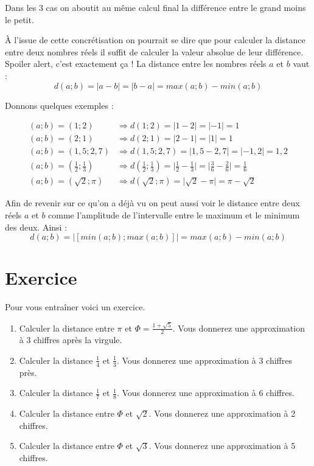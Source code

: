 \documentclass[a4paper, 11pt, twoside]{book}
\begin{document}
Dans les 3 cas on aboutit au même calcul final la différence entre
le grand moins le petit.


À l'issue de cette concrétisation on pourrait se dire que pour
calculer la distance entre deux nombres réels il suffit de calculer
la valeur absolue de leur différence. Spoiler alert, c'est
exactement ça ! La distance entre les nombres réels \(a\) et \(b\)
vaut :
\[d(a; b) = \lvert a - b \rvert = \lvert b - a \rvert = max(a ;
   b) - min(a ; b)\]


Donnons quelques exemples :

\begin{align*}
(a; b) = (1; 2) &\Rightarrow d(1; 2) = \lvert 1 - 2 \rvert = \lvert -1\rvert = 1\\
(a; b) = (2; 1) &\Rightarrow d(2; 1) = \lvert 2 - 1 \rvert = \lvert 1\rvert = 1\\
(a; b) = (1,5; 2,7) &\Rightarrow d(1,5; 2,7) = \lvert 1,5 - 2,7 \rvert = \lvert -1,2\rvert = 1,2\\
(a; b) = \left(\frac{1}{2}; \frac{1}{3}\right) &\Rightarrow d\left(\frac{1}{2}; \frac{1}{3}\right) = \lvert \frac{1}{2} - \frac{1}{3} \rvert = \lvert \frac{3}{6} - \frac{2}{6}\rvert = \frac{1}{6}\\
(a; b) = (\sqrt{2}; \pi) &\Rightarrow d(\sqrt{2}; \pi) = \lvert \sqrt{2} - \pi \rvert = \pi - \sqrt{2}
\end{align*}

Afin de revenir sur ce qu'on a déjà vu on peut aussi voir le
distance entre deux réels \(a\) et \(b\) comme l'amplitude de
l'intervalle entre le maximum et le minimum des deux. Ainsi :
\[d(a ; b) = |[min(a ; b) ; max(a ; b)]| = max(a ; b) - min(a ; b)\]

\section{Exercice}
\label{sec:org44a8f75}
Pour vous entraîner voici un exercice.

\begin{enumerate}
\item Calculer la distance entre \(\pi\) et \(\Phi = \frac{1 +
       \sqrt{5}}{2}\). Vous donnerez une approximation à 3 chiffres
après la virgule.
\item Calculer la distance \(\frac{1}{4}\) et \(\frac{1}{3}\). Vous
donnerez une approximation à 3 chiffres près.
\item Calculer la distance \(\frac{1}{7}\) et \(\frac{1}{8}\). Vous
donnerez une approximation à 6 chiffres.
\item Calculer la distance entre \(\Phi\) et \(\sqrt{2}\). Vous donnerez
une approximation à 2 chiffres.
\item Calculer la distance entre \(\Phi\) et \(\sqrt{3}\). Vous donnerez
une approximation à 5 chiffres.
\end{enumerate}
\end{document}
